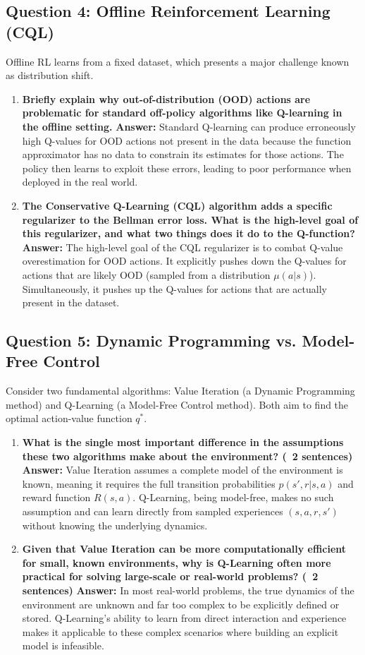 \documentclass[12pt]{article}
\begin{document}
\subsection{Question 4: Offline Reinforcement Learning (CQL)}
Offline RL learns from a fixed dataset, which presents a major challenge known as distribution shift.
\begin{enumerate}
    \item \textbf{Briefly explain why out-of-distribution (OOD) actions are problematic for standard off-policy algorithms like Q-learning in the offline setting.}
    \textbf{Answer:} Standard Q-learning can produce erroneously high Q-values for OOD actions not present in the data because the function approximator has no data to constrain its estimates for those actions. The policy then learns to exploit these errors, leading to poor performance when deployed in the real world.
    \item \textbf{The Conservative Q-Learning (CQL) algorithm adds a specific regularizer to the Bellman error loss. What is the high-level goal of this regularizer, and what two things does it do to the Q-function?}
    \textbf{Answer:} The high-level goal of the CQL regularizer is to combat Q-value overestimation for OOD actions. It explicitly pushes down the Q-values for actions that are likely OOD (sampled from a distribution $\mu(a|s)$). Simultaneously, it pushes up the Q-values for actions that are actually present in the dataset.
\end{enumerate}

\subsection{Question 5: Dynamic Programming vs. Model-Free Control}
Consider two fundamental algorithms: Value Iteration (a Dynamic Programming method) and Q-Learning (a Model-Free Control method). Both aim to find the optimal action-value function $q^*$.
\begin{enumerate}
    \item \textbf{What is the single most important difference in the assumptions these two algorithms make about the environment? (~2 sentences)}
    \textbf{Answer:} Value Iteration assumes a complete model of the environment is known, meaning it requires the full transition probabilities $p(s',r|s,a)$ and reward function $R(s,a)$. Q-Learning, being model-free, makes no such assumption and can learn directly from sampled experiences $(s, a, r, s')$ without knowing the underlying dynamics.
    \item \textbf{Given that Value Iteration can be more computationally efficient for small, known environments, why is Q-Learning often more practical for solving large-scale or real-world problems? (~2 sentences)}
    \textbf{Answer:} In most real-world problems, the true dynamics of the environment are unknown and far too complex to be explicitly defined or stored. Q-Learning's ability to learn from direct interaction and experience makes it applicable to these complex scenarios where building an explicit model is infeasible.
\end{enumerate}
\end{document}
